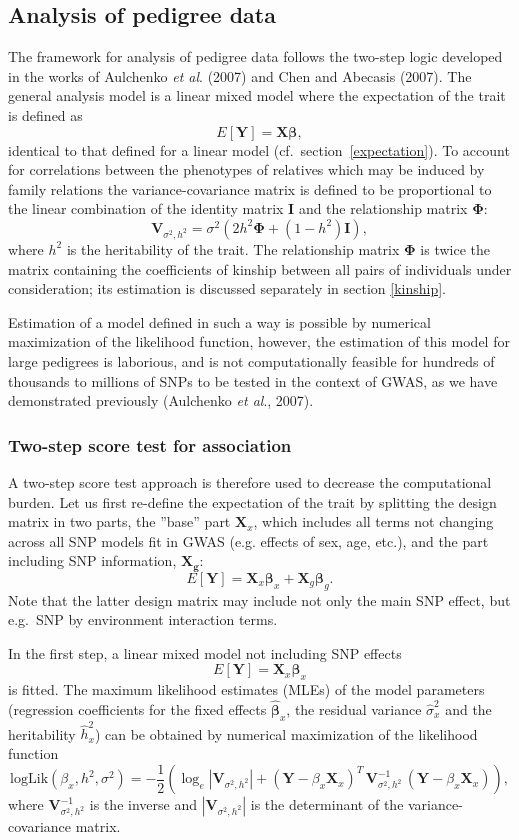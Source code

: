 \documentclass[12pt,a4paper]{article}
\begin{document}
\subsection{Analysis of pedigree data}
The framework for analysis of pedigree data follows the two-step logic
developed in the works of Aulchenko \emph{et al}. (2007) and Chen and
Abecasis (2007). The general analysis model is a linear mixed model
where the expectation of the trait is defined as
$$
E[\mathbf{Y}] = \mathbf{X} \mathbf{\beta},
$$
identical to that defined for a linear model
(cf.~section~\ref{expectation}). To account for correlations between
the phenotypes of relatives which may be induced by family relations
the variance-covariance matrix is defined to be proportional to the
linear combination of the identity matrix $\mathbf{I}$ and the
relationship matrix $\mathbf{\Phi}$:
$$
\mathbf{V}_{\sigma^2,h^2} = \sigma^2 \left( 2 h^2 \mathbf{\Phi} + (1-h^2)
\mathbf{I} \right),
$$
where $h^2$ is the heritability of the trait. The relationship matrix
$\mathbf{\Phi}$ is twice the matrix containing the coefficients of
kinship between all pairs of individuals under consideration; its
estimation is discussed separately in section \ref{kinship}.

Estimation of a model defined in such a way is possible by numerical
maximization of the likelihood function, however, the estimation of
this model for large pedigrees is laborious, and is not
computationally feasible for hundreds of thousands to millions of SNPs
to be tested in the context of GWAS, as we have demonstrated
previously (Aulchenko \emph{et al}., 2007).

\subsubsection{Two-step score test for association}
A two-step score test approach is therefore used to decrease the computational
burden. Let us first re-define the expectation of the trait by splitting the
design matrix in two parts, the ''base'' part $\mathbf{X}_x$, which includes all
terms not changing across all SNP models fit in GWAS (e.g. effects of sex, age, etc.),
and the part including SNP information, $\mathbf{X_g}$:
$$
E[\mathbf{Y}] = \mathbf{X}_x \mathbf{\beta}_x +
\mathbf{X}_g \mathbf{\beta}_g.
$$
Note that the latter design matrix may include not only the main SNP effect, but
e.g.\ SNP by environment interaction terms.

In the first step, a linear mixed model not including SNP effects
$$
E[\mathbf{Y}] = \mathbf{X}_x \mathbf{\beta}_x
$$
is fitted. The maximum likelihood estimates (MLEs) of the model
parameters (regression coefficients for the fixed effects
$\hat{\mathbf{\beta}}_x$, the residual variance $\hat{\sigma}^2_x$ and
the heritability $\hat{h}^2_x$) can be obtained by numerical
maximization of the likelihood function
$$
\mathrm{logLik}(\beta_x,h^2,\sigma^2) = -\frac{1}{2} \left(
  \log_e|\mathbf{V}_{\sigma^2,h^2}| + (\mathbf{Y} - \beta_x
  \mathbf{X}_x)^T \, \mathbf{V}_{\sigma^2,h^2}^{-1} \, (\mathbf{Y} -
  \beta_x \mathbf{X}_x) \right ),
$$
where $\mathbf{V}_{\sigma^2,h^2}^{-1}$ is the inverse and
$|\mathbf{V}_{\sigma^2,h^2}|$ is the determinant of the
variance-covariance matrix.
\end{document}
